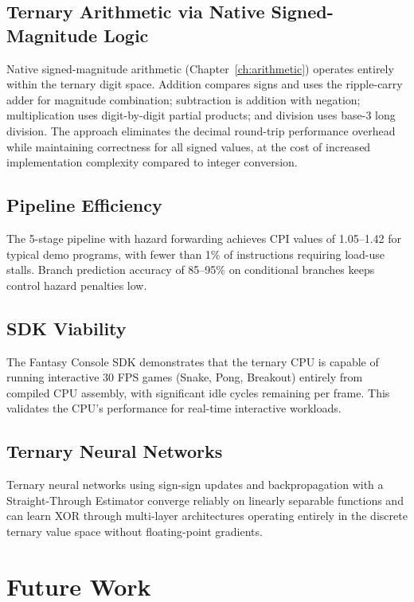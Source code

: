 \documentclass[12pt,a4paper,twoside]{book}
\theoremstyle{trinarytheorem}
\theoremstyle{trinarydefinition}
\begin{document}
\subsection{Ternary Arithmetic via Native Signed-Magnitude Logic}

Native signed-magnitude arithmetic (Chapter~\ref{ch:arithmetic}) operates
entirely within the ternary digit space. Addition compares signs and uses
the ripple-carry adder for magnitude combination; subtraction is addition
with negation; multiplication uses digit-by-digit partial products; and
division uses base-3 long division. The approach eliminates the decimal
round-trip performance overhead while maintaining correctness for all
signed values, at the cost of increased implementation complexity
compared to integer conversion.

\subsection{Pipeline Efficiency}

The 5-stage pipeline with hazard forwarding achieves CPI values of
1.05--1.42 for typical demo programs, with fewer than 1\% of instructions
requiring load-use stalls. Branch prediction accuracy of 85--95\% on
conditional branches keeps control hazard penalties low.

\subsection{SDK Viability}

The Fantasy Console SDK demonstrates that the ternary CPU is capable of
running interactive 30 FPS games (Snake, Pong, Breakout) entirely from
compiled CPU assembly, with significant idle cycles remaining per frame.
This validates the CPU's performance for real-time interactive workloads.

\subsection{Ternary Neural Networks}

Ternary neural networks using sign-sign updates and backpropagation
with a Straight-Through Estimator converge reliably on linearly separable
functions and can learn XOR through multi-layer architectures operating
entirely in the discrete ternary value space without floating-point
gradients.

\section{Future Work}
\end{document}
